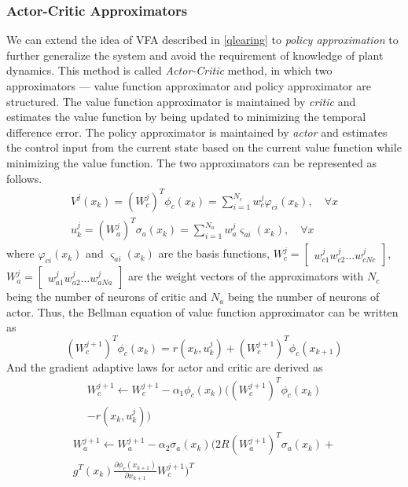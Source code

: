 \documentclass[conference]{IEEEtran}
\begin{document}
\subsubsection{Actor-Critic Approximators}
We can extend the idea of VFA described in \ref{qlearing} to \textit{policy approximation} to further generalize the system and avoid the requirement of knowledge of plant dynamics. This method is called \textit{Actor-Critic} method, in which two approximators --- value function approximator and policy approximator are structured. The value function approximator is maintained by \textit{critic} and estimates the value function by being updated to minimizing the temporal difference error. The policy approximator is maintained by \textit{actor} and estimates the control input from the current state based on the current value function while minimizing the value function. The two approximators can be represented as follows.
\begin{equation}
\begin{aligned} \label{ac}
	V^{j}(x_k) = (W^j_c)^T\phi_c(x_k) = \sum_{i=1}^{N_c}w^j_c\varphi_{ci}(x_k), \quad \forall x \\
	u^j_k = (W^j_a)^T\sigma_a(x_k) = \sum_{i=1}^{N_a}w^j_a\varsigma_{ai}(x_k), \quad \forall x 
\end{aligned}
\end{equation}
where \(\varphi_{ci}(x_k)\) and \(\varsigma_{ai}(x_k)\) are the basis functions,
\(W^j_c= 
\begin{bmatrix}
w^j_{c1} w^j_{c2} \dots w^j_{cNc}
\end{bmatrix}\), 
\(W^j_a= 
\begin{bmatrix}
w^j_{a1} w^j_{a2} \dots w^j_{aNa}
\end{bmatrix}\) are the weight vectors of the approximators with \(N_c\) being the number of neurons of critic and \(N_a\) being the number of neurons of actor.
Thus, the Bellman equation of value function approximator can be written as
\[(W^{j+1}_c)^T\phi_c(x_k) = r(x_k, u^j_k) + (W^{j+1}_c)^T\phi_c(x_{k+1})\]
And the gradient adaptive laws for actor and critic are derived as
\begin{equation}
\begin{aligned}
	W^{j+1}_c \gets W^{j+1}_c - \alpha_1\phi_c(x_k)(( W^{j+1}_c)^T\phi_c(x_k) \\- r(x_k, u^j_k))
\end{aligned}
\end{equation}
\begin{equation}
\begin{aligned}
	W^{j+1}_a \gets W^{j+1}_a - \alpha_2\sigma_a(x_k)\Big(2R( W^{j+1}_a)^T\sigma_a(x_k) + \\ g^T(x_k)\frac{\partial{\phi_c(x_{k+1})}}{\partial{x_{k+1}}}W^{j+1}_c\Big)^T
\end{aligned}
\end{equation}
\end{document}
